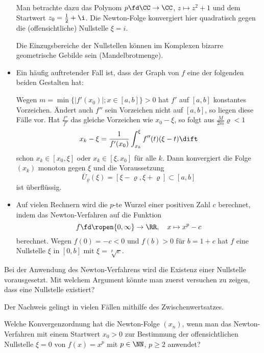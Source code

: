 \begin{antwort}
\begin{itemize}
      Man betrachte dazu das Polynom $p\fd\CC\to\CC$, $z\mapsto z^2+1$
      und dem Startwert $z_0 = \frac12 + \i$. Die Newton-Folge 
      konvergiert hier quadratisch gegen die (offensichtliche) Nullstelle 
      $\xi=i$. 

      Die Einzugsbereiche der Nullstellen können im Komplexen bizarre 
      geometrische Gebilde sein (Mandelbrotmenge). 
      
    \item Ein häufig auftretender Fall ist, dass der Graph von $f$ eine 
      der folgenden beiden Gestalten hat:

      Wegen $m= \min\{ \left| f'(x_0) \right|; x\in[a,b] \}>0$ hat  
      $f'$ auf $[a,b]$ konstantes Vorzeichen. Ändert auch $f''$ sein Vorzeichen 
      nicht auf $[a,b]$, so liegen diese Fälle vor. Hat $\frac{f''}{f'}$ 
      das gleiche Vorzeichen wie $x_0-\xi$, so folgt aus $\frac{M}{2m} \varrho <1$ 
      \[
      x_k - \xi = \frac{1}{f'(x_0)} \int_{x_k}^{\xi} f''(t) (\xi-t) \dift
      \]
      schon $x_k \in [x_0,\xi]$ oder $x_k \in [\xi,x_0]$ für alle $k$. 
      Dann konvergiert die Folge $(x_k)$ monoton gegen $\xi$ und die Voraussetzung 
      \[
      \overline{U}_\varrho(\xi) = [\xi-\varrho, \xi+\varrho] \subset [a,b]
      \]
      ist überflüssig. 
    \item
      Auf vielen Rechnern wird die $p$-te Wurzel einer positiven Zahl $c$ 
      berechnet, indem das Newton-Verfahren auf die Funktion 
      \[
      f\fd \ropen{0,\infty} \to \RR, \quad x\mapsto x^p-c 
      \]
      berechnet. Wegen $f(0) = -c <0$ und $f(b)>0$ für $b = 1+c$ 
      hat $f$ eine Nullstelle $\xi$ in $[0,b]$ mit $\xi=\sqrt[p]{c}$. 
    \end{itemize}
  \end{antwort}




  \begin{frage}
    Bei der Anwendung des Newton-Verfahrens wird die Existenz einer 
    Nullstelle vorausgesetzt. Mit welchem Argument könnte 
    man zuerst versuchen zu zeigen, dass eine Nullstelle existiert? 
  \end{frage} 

  \begin{antwort}
    
    Der Nachweis gelingt in vielen Fällen 
    mithilfe des Zwischenwertsatzes. 
    \AntEnd
  \end{antwort}

  \begin{frage}
    Welche Konvergenzordnung hat die Newton-Folge $(x_n)$, wenn man 
    das Newton-Verfahren mit einem Startwert $x_0>0$ zur Bestimmung der 
    offensichtlichen Nullstelle $\xi=0$ von $f(x)=x^p$ mit $p\in \NN$, 
    $p\ge 2$ anwendet?
  \end{frage}

